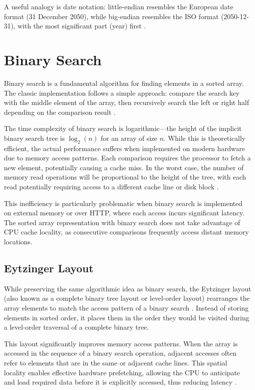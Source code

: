 A useful analogy is date notation: little-endian resembles the European date format (31 December 2050), while big-endian resembles the ISO format (2050-12-31), with the most significant part (year) first \citep{endianness_mdn}.

\section{Binary Search}
\label{tb:binary_search}

Binary search is a fundamental algorithm for finding elements in a sorted array. The classic implementation follows a simple approach: compare the search key with the middle element of the array, then recursively search the left or right half depending on the comparison result \citep{binary_search}.

The time complexity of binary search is logarithmic—the height of the implicit binary search tree is $\log_2(n)$ for an array of size $n$. While this is theoretically efficient, the actual performance suffers when implemented on modern hardware due to memory access patterns. Each comparison requires the processor to fetch a new element, potentially causing a cache miss. In the worst case, the number of memory read operations will be proportional to the height of the tree, with each read potentially requiring access to a different cache line or disk block \citep{binary_search}.

This inefficiency is particularly problematic when binary search is implemented on external memory or over HTTP, where each access incurs significant latency. The sorted array representation with binary search does not take advantage of CPU cache locality, as consecutive comparisons frequently access distant memory locations.

\subsection{Eytzinger Layout}
\label{tb:eytzinger_layout}

While preserving the same algorithmic idea as binary search, the Eytzinger layout (also known as a complete binary tree layout or level-order layout) rearranges the array elements to match the access pattern of a binary search \citep{binary_search}. Instead of storing elements in sorted order, it places them in the order they would be visited during a level-order traversal of a complete binary tree.

This layout significantly improves memory access patterns. When the array is accessed in the sequence of a binary search operation, adjacent accesses often refer to elements that are in the same or adjacent cache lines.  This spatial locality enables effective hardware prefetching, allowing the CPU to anticipate and load required data before it is explicitly accessed, thus reducing latency \citep{binary_search}.

